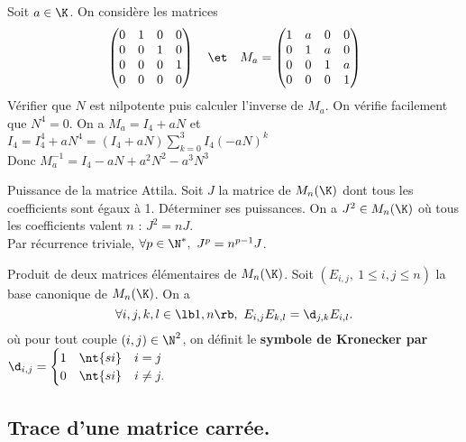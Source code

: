 \documentclass[11pt]{article}
\begin{document}
\pagebreak

\begin{ex}{}{}
    Soit $a\in\K$. On considère les matrices
    \begin{equation*}
        \begin{pmatrix}
            0&1&0&0\\
            0&0&1&0\\
            0&0&0&1\\
            0&0&0&0
        \end{pmatrix}
        \quad\et\quad M_a = \begin{pmatrix}
            1&a&0&0\\
            0&1&a&0\\
            0&0&1&a\\
            0&0&0&1
        \end{pmatrix}
    \end{equation*}
    Vérifier que $N$ est nilpotente puis calculer l'inverse de $M_a$.
    \tcblower
    On vérifie facilement que $N^4=0$. On a $M_a=I_4+aN$ et $I_4=I_4^4+aN^4=(I_4+aN)\sum_{k=0}^{3}I_4(-aN)^k$\\
    Donc $M_a^{-1}=I_4-aN+a^2N^2-a^3N^3$
\end{ex}

\begin{ex}{Puissance de la matrice Attila.}{}
    Soit $J$ la matrice de $M_n(\K)$ dont tous les coefficients sont égaux à 1. Déterminer ses puissances.
    \tcblower
    On a $J^2\in M_n(\K)$ où tous les coefficients valent $n$ : $J^2=nJ$.\\
    Par récurrence triviale, $\forall p \in \N^*, ~ J^p = n^{p-1}J$.
\end{ex}

\begin{prop}{Produit de deux matrices élémentaires de $M_n(\K)$.}{}
    Soit $(E_{i,j}, ~ 1 \leq i,j \leq n)$ la base canonique de $M_n(\K)$. On a
    \begin{equation*}
        \forall i,j,k,l \in \lb1,n\rb, ~ E_{i,j}E_{k,l} = \d_{j,k}E_{i,l}.
    \end{equation*}
    où pour tout couple $(i,j)\in\N^2$, on définit le \bf{symbole de Kronecker} par $\d_{i,j}=\begin{cases}
        1 &\nt{si} \quad i=j\\
        0 &\nt{si} \quad i\neq j.
    \end{cases}$
\end{prop}

\subsection{Trace d'une matrice carrée.}
\end{document}
